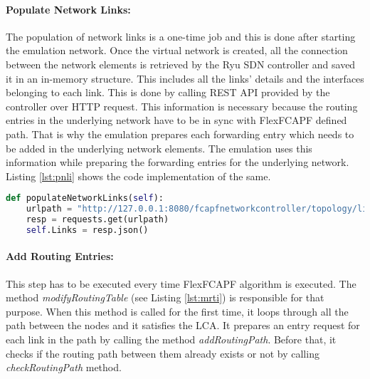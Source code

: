 \paragraph{Populate Network Links:}
The population of network links is a one-time job and this is done after starting the emulation network. Once the virtual network is created, all the connection between the network elements is retrieved by the Ryu SDN controller and saved it in an in-memory structure. This includes all the links' details and the interfaces belonging to each link. This is done by calling REST API provided by the controller over HTTP request. This information is necessary because the routing entries in the underlying network have to be in sync with FlexFCAPF defined path. That is why the emulation prepares each forwarding entry which needs to be added in the underlying network elements. The emulation uses this information while preparing the forwarding entries for the underlying network. Listing \ref{lst:pnli} shows the code implementation of the same.

\begin{lstlisting}[caption={Populate network links implementation},label={lst:pnli},language=Python,tabsize=2,basicstyle=\footnotesize,breaklines=true, showspaces=false,showstringspaces=false,showtabs=false,frame=single]
def populateNetworkLinks(self):
	urlpath = "http://127.0.0.1:8080/fcapfnetworkcontroller/topology/links"
	resp = requests.get(urlpath)
	self.Links = resp.json()
\end{lstlisting}

\paragraph{Add Routing Entries:}
This step has to be executed every time FlexFCAPF algorithm is executed. The method \textit{modifyRoutingTable} (see Listing \ref{lst:mrti}) is responsible for that purpose. When this method is called for the first time, it loops through all the path between the nodes and it satisfies the LCA. It prepares an entry request for each link in the path by calling the method \textit{addRoutingPath}. Before that, it checks if the routing path between them already exists or not by calling \textit{checkRoutingPath} method.

